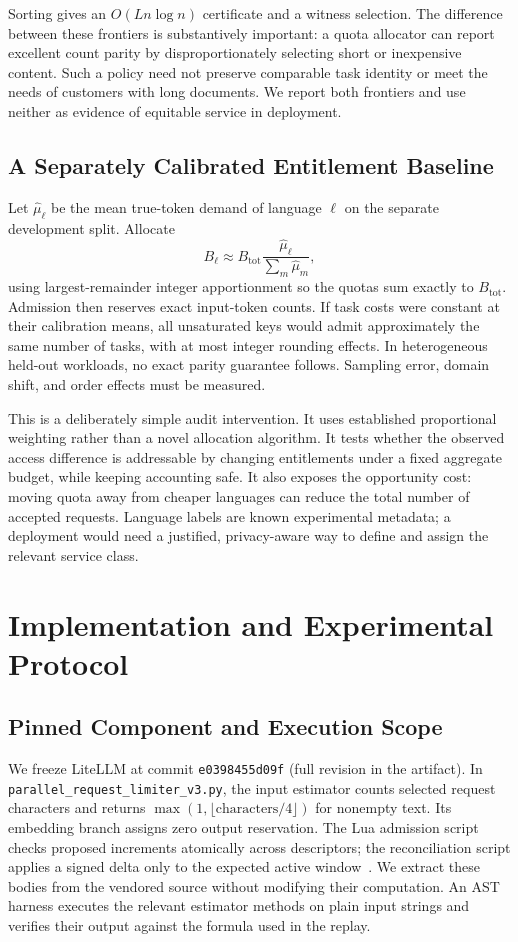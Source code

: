 \documentclass[manuscript,screen]{acmart}
\begin{document}
Sorting gives an $O(Ln\log n)$ certificate and a witness selection. The difference between these frontiers is substantively important: a quota allocator can report excellent count parity by disproportionately selecting short or inexpensive content. Such a policy need not preserve comparable task identity or meet the needs of customers with long documents. We report both frontiers and use neither as evidence of equitable service in deployment.

\subsection{A Separately Calibrated Entitlement Baseline}
Let $\widehat\mu_\ell$ be the mean true-token demand of language $\ell$ on the separate development split. Allocate
\begin{equation}
B_\ell\approx B_{\mathrm{tot}}\frac{\widehat\mu_\ell}{\sum_m\widehat\mu_m},\label{eq:cal}
\end{equation}
using largest-remainder integer apportionment so the quotas sum exactly to $B_{\mathrm{tot}}$. Admission then reserves exact input-token counts. If task costs were constant at their calibration means, all unsaturated keys would admit approximately the same number of tasks, with at most integer rounding effects. In heterogeneous held-out workloads, no exact parity guarantee follows. Sampling error, domain shift, and order effects must be measured.

This is a deliberately simple audit intervention. It uses established proportional weighting rather than a novel allocation algorithm. It tests whether the observed access difference is addressable by changing entitlements under a fixed aggregate budget, while keeping accounting safe. It also exposes the opportunity cost: moving quota away from cheaper languages can reduce the total number of accepted requests. Language labels are known experimental metadata; a deployment would need a justified, privacy-aware way to define and assign the relevant service class.

\section{Implementation and Experimental Protocol}
\subsection{Pinned Component and Execution Scope}
We freeze LiteLLM at commit \texttt{e0398455d09f} (full revision in the artifact). In \texttt{parallel\_request\_limiter\_v3.py}, the input estimator counts selected request characters and returns $\max(1,\lfloor\mathrm{characters}/4\rfloor)$ for nonempty text. Its embedding branch assigns zero output reservation. The Lua admission script checks proposed increments atomically across descriptors; the reconciliation script applies a signed delta only to the expected active window~\cite{litellm}. We extract these bodies from the vendored source without modifying their computation. An AST harness executes the relevant estimator methods on plain input strings and verifies their output against the formula used in the replay.
\end{document}
